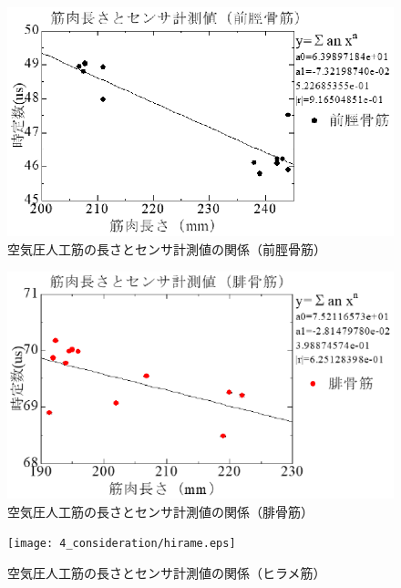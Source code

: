 \begin{figure}[h]
    \begin{center}
        \includegraphics[width=0.78\columnwidth,clip]{4_consideration/zenkei.eps}
    \end{center}
    \caption{空気圧人工筋の長さとセンサ計測値の関係（前脛骨筋）}
    \label{ml-rc1}
\end{figure}

\begin{figure}[h]
    \begin{center}
        \includegraphics[width=0.78\columnwidth,clip]{4_consideration/hikotsu.eps}
    \end{center}
    \caption{空気圧人工筋の長さとセンサ計測値の関係（腓骨筋）}
    \label{ml-rc2}
\end{figure}

\begin{figure}[h]
    \begin{center}
        \texttt{[image: 4\_consideration/hirame.eps]}
    \end{center}
    \caption{空気圧人工筋の長さとセンサ計測値の関係（ヒラメ筋）}
    \label{ml-rc3}
\end{figure}